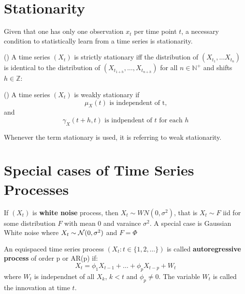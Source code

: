 \section{Stationarity}

Given that one has only one observation $x_t$ per time point $t$,
a necessary condition to statistically learn from a time series is stationarity.

\begin{definition}(\citeauthor{brockwell_introduction_2016})
    A time series $(X_t)$ is strictly stationary iff
    the distribution of $(X_{t_1}, \dots X_{t_n})$ is identical to the distribution of
    $(X_{t_{1+h}}, \dots ,X_{t_{n+h}})$ for all $n \in \mathbb{N}^{+}$
    and shifts $h \in \mathbb{Z}$:
\end{definition}


\begin{definition}(\citeauthor{brockwell_introduction_2016})
    A time series $(X_t)$ is weakly stationary if
    \[
        \mu_X(t) \text{ is independent of t,}
    \]
    and
    \[
        \gamma_X(t+h, t) \text{ is indpendent of $t$ for each $h$}
    \]
\end{definition}

Whenever the term stationary is used, it is referring to weak stationarity.

\section{Special cases of Time Series Processes}\label{sec:example-of-time-series-processes}

\begin{definition} If $(X_t)$ is \textbf{white noise} process,
    then $X_t \sim WN(0, \sigma^2)$, that is $X_t \sim F$ iid for some
    distribution $F$ with mean $0$ and varaince $\sigma^2$. A special case is Gaussian White
    noise where $X_t \sim \operatorname{\mathcal{N}}(0, \sigma^2)$ and $F= \Phi$
\end{definition}

\begin{definition}
    An equispaced time series process $(X_t: t \in \{1,2, \dots\})$ is called \textbf{autoregressive process}
    of order p or AR(p) if:
    \[
        X_t = \phi_1 X_{t-1} + \dots + \phi_p X_{t-p} + W_t
    \]
    where $W_t$ is independnet of all $X_k$, $k < t$ and $\phi_p \neq 0$. The variable $W_t$ is called
    the innovation at time $t$.

\end{definition}

